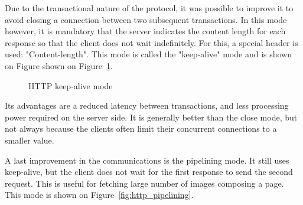Due to the transactional nature of the protocol, it was possible to improve it
to avoid closing a connection between two subsequent transactions. In this mode
however, it is mandatory that the server indicates the content length for each
response so that the client does not wait indefinitely. For this, a special
header is used: "Content-length". This mode is called the "keep-alive" mode
and is shown on Figure shown on Figure~\ref{fig:http_keep_alive}.


\begin{figure}[!ht]
\centering
{}

\caption{HTTP keep-alive mode}
\label{fig:http_keep_alive}
\end{figure}

Its advantages are a reduced latency between transactions, and less processing
power required on the server side. It is generally better than the close mode,
but not always because the clients often limit their concurrent connections to
a smaller value.

A last improvement in the communications is the pipelining mode. It still uses
keep-alive, but the client does not wait for the first response to send the
second request. This is useful for fetching large number of images composing a
page. This mode is shown on Figure~\ref{fig:http_pipelining}.

